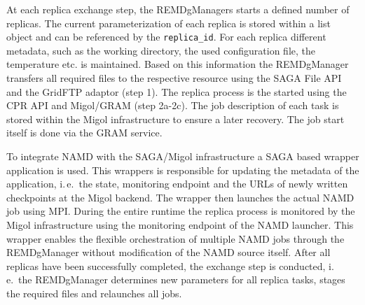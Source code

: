 \documentclass[times, 10pt,twocolumn]{article}
\begin{document}
At each replica exchange step, the REMDgManagers starts a defined
number of replicas. The current parameterization of each replica is
stored within a list object and can be referenced by the
\texttt{replica\_id}. For each replica different metadata, such as the
working directory, the used configuration file, the temperature
etc. is maintained.  Based on this information the REMDgManager
transfers all required files to the respective resource using the SAGA
File API and the GridFTP adaptor (step 1). The replica process is the
started using the CPR API and Migol/GRAM (step 2a-2c).  The job
description of each task is stored within the Migol infrastructure to
ensure a later recovery.  The job start itself is done via the GRAM
service.
  

To integrate NAMD with the SAGA/Migol infrastructure a SAGA based
wrapper application is used.  This wrappers is responsible for
updating the metadata of the application, i.\,e.\ the state,
monitoring endpoint and the URLs of newly written checkpoints at the
Migol backend.  The wrapper then launches the actual NAMD job using
MPI. During the entire runtime the replica process is monitored by the
Migol infrastructure using the monitoring endpoint of the NAMD
launcher. This wrapper enables the flexible orchestration of multiple
NAMD jobs through the REMDgManager without modification of the NAMD
source itself. After all replicas have been successfully completed,
the exchange step is conducted, i.\,e.\ the REMDgManager determines
new parameters for all replica tasks, stages the required files and
relaunches all jobs.

                                             
\end{document}
